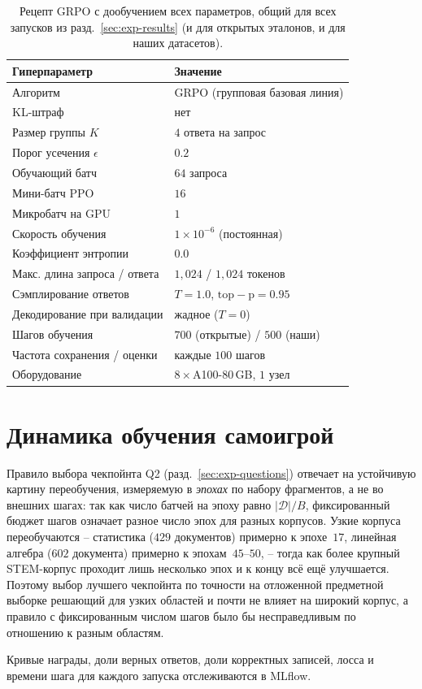 \documentclass{article}
\begin{document}
\begin{table}[h]
  \centering
  \caption{Рецепт GRPO с дообучением всех параметров, общий для всех запусков из разд.~\ref{sec:exp-results} (и для открытых эталонов, и для наших датасетов).}
  \label{tab:downstream-grpo-hp}
  \begin{tabular}{ll}
    \toprule
    Гиперпараметр & Значение \\
    \midrule
    Алгоритм                  & GRPO (групповая базовая линия) \\
    KL-штраф                  & нет \\
    Размер группы $K$         & $4$ ответа на запрос \\
    Порог усечения $\epsilon$ & $0.2$ \\
    Обучающий батч            & $64$ запроса \\
    Мини-батч PPO             & $16$ \\
    Микробатч на GPU          & $1$ \\
    Скорость обучения         & $1\!\times\!10^{-6}$ (постоянная) \\
    Коэффициент энтропии      & $0.0$ \\
    Макс. длина запроса / ответа & $1{,}024$ / $1{,}024$ токенов \\
    Сэмплирование ответов     & $T\!=\!1.0$, $\mathrm{top\!-\!p}\!=\!0.95$ \\
    Декодирование при валидации & жадное ($T\!=\!0$) \\
    Шагов обучения            & $700$ (открытые) / $500$ (наши) \\
    Частота сохранения / оценки & каждые $100$ шагов \\
    Оборудование              & $8\!\times\!$A100-$80$\,GB, $1$ узел \\
    \bottomrule
  \end{tabular}
\end{table}

\section{Динамика обучения самоигрой}\label{app:dynamics}

Правило выбора чекпойнта Q2 (разд.~\ref{sec:exp-questions}) отвечает на устойчивую картину переобучения, измеряемую в \emph{эпохах} по набору фрагментов, а не во внешних шагах: так как число батчей на эпоху равно $|\mathcal{D}|/B$, фиксированный бюджет шагов означает разное число эпох для разных корпусов. Узкие корпуса переобучаются -- статистика ($429$ документов) примерно к эпохе~$17$, линейная алгебра ($602$ документа) примерно к эпохам~$45$--$50$, -- тогда как более крупный STEM-корпус проходит лишь несколько эпох и к концу всё ещё улучшается. Поэтому выбор лучшего чекпойнта по точности на отложенной предметной выборке решающий для узких областей и почти не влияет на широкий корпус, а правило с фиксированным числом шагов было бы несправедливым по отношению к разным областям.

Кривые награды, доли верных ответов, доли корректных записей, лосса и времени шага для каждого запуска отслеживаются в MLflow.
\end{document}
